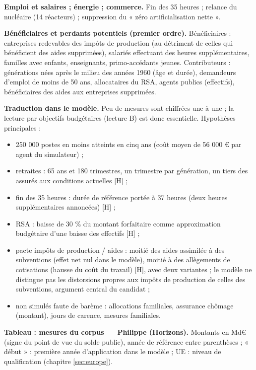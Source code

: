 \documentclass[
  11pt,
  11pt,
  a4paper,
  openany]{book}
\providecommand{\tightlist}{%
  \setlength{\itemsep}{0pt}\setlength{\parskip}{0pt}}
\begin{document}
\textbf{Emploi et salaires ; énergie ; commerce.} Fin des 35 heures ;
relance du nucléaire (14 réacteurs) ; suppression du « zéro
artificialisation nette ».

\textbf{Bénéficiaires et perdants potentiels (premier ordre).}
Bénéficiaires : entreprises redevables des impôts de production (au
détriment de celles qui bénéficient des aides supprimées), salariés
effectuant des heures supplémentaires, familles avec enfants,
enseignants, primo-accédants jeunes. Contributeurs : générations nées
après le milieu des années 1960 (âge et durée), demandeurs d'emploi de
moins de 50 ans, allocataires du RSA, agents publics (effectifs),
bénéficiaires des aides aux entreprises supprimées.

\textbf{Traduction dans le modèle.} Peu de mesures sont chiffrées une à
une ; la lecture par objectifs budgétaires (lecture B) est donc
essentielle. Hypothèses principales :

\begin{itemize}
\tightlist
\item
  250 000 postes en moins atteints en cinq ans (coût moyen de 56 000 €
  par agent du simulateur) ;
\item
  retraites : 65 ans et 180 trimestres, un trimestre par génération, un
  tiers des assurés aux conditions actuelles {[}H{]} ;
\item
  fin des 35 heures : durée de référence portée à 37 heures (deux heures
  supplémentaires annoncées) {[}H{]} ;
\item
  RSA : baisse de 30 \% du montant forfaitaire comme approximation
  budgétaire d'une baisse des effectifs {[}H{]} ;
\item
  pacte impôts de production / aides : moitié des aides assimilée à des
  subventions (effet net nul dans le modèle), moitié à des allègements
  de cotisations (hausse du coût du travail) {[}H{]}, avec deux
  variantes ; le modèle ne distingue pas les distorsions propres aux
  impôts de production de celles des subventions, argument central du
  candidat ;
\item
  non simulés faute de barème : allocations familiales, assurance
  chômage (montant), jours de carence, mesures familiales.
\end{itemize}

\textbf{Tableau : mesures du corpus --- Philippe (Horizons).} Montants
en Md€ (signe du point de vue du solde public), année de référence entre
parenthèses ; « début » : première année d'application dans le modèle ;
UE : niveau de qualification (chapitre \ref{sec:europe}).
\end{document}
